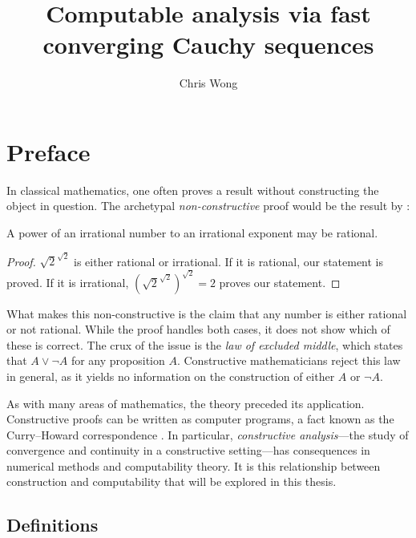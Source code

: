 \documentclass[leqno]{report}
\begin{document}
\author{Chris Wong}
\title{Computable analysis via fast converging Cauchy sequences}
\maketitle

\chapter*{Preface}

In classical mathematics, one often proves a result without constructing the object in question. The archetypal \textit{non-constructive} proof would be the result by \citet{jarden1953simple}:

\begin{Theorem}
    A power of an irrational number to an irrational exponent may be rational.
\end{Theorem}

\begin{proof}
    $\sqrt{2}^{\sqrt{2}}$ is either rational or irrational. If it is rational, our statement is proved. If it is irrational, $(\sqrt{2}^{\sqrt{2}})^{\sqrt{2}} = 2$ proves our statement.
\end{proof}

What makes this non-constructive is the claim that any number is either rational or not rational. While the proof handles both cases, it does not show which of these is correct. The crux of the issue is the \textit{law of excluded middle}, which states that $A \vee \neg A$ for any proposition $A$. Constructive mathematicians reject this law in general, as it yields no information on the construction of either $A$ or $\neg A$.

As with many areas of mathematics, the theory preceded its application. Constructive proofs can be written as computer programs, a fact known as the Curry--Howard correspondence \citep{wadler2015}. In particular, \textit{constructive analysis}---the study of convergence and continuity in a constructive setting---has consequences in numerical methods and computability theory. It is this relationship between construction and computability that will be explored in this thesis.


\section{Definitions}
\end{document}
